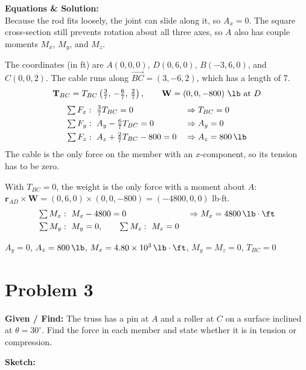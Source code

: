 \documentclass[11pt]{article}
\newcommand{\problemstart}[2]{%
    \clearpage
    \setlength{\parskip}{0.5\baselineskip}
    \setlength{\abovedisplayskip}{4pt}\setlength{\belowdisplayskip}{4pt}
    \section*{Problem #1}
    \textbf{Given / Find:} #2

    \textbf{Sketch:}
}
\begin{document}
\textbf{Equations \& Solution:}\\
Because the rod fits loosely, the joint can slide along it, so $A_x=0$. The square cross-section still prevents rotation about all three axes, so $A$ also has couple moments $M_x$, $M_y$, and $M_z$.

The coordinates (in ft) are $A(0,0,0)$, $D(0,6,0)$, $B(-3,6,0)$, and $C(0,0,2)$. The cable runs along $\overrightarrow{BC}=(3,-6,2)$, which has a length of \SI{7}{\ft}.
\[
\mathbf T_{BC}=T_{BC}\left(\tfrac37,\,-\tfrac67,\,\tfrac27\right),\qquad \mathbf W=(0,0,-800)\ \si{\lb}\ \text{at } D
\]
\begin{align*}
\textstyle\sum F_x&:\ \tfrac37T_{BC}=0 &&\Rightarrow T_{BC}=0\\
\textstyle\sum F_y&:\ A_y-\tfrac67T_{BC}=0 &&\Rightarrow A_y=0\\
\textstyle\sum F_z&:\ A_z+\tfrac27T_{BC}-800=0 &&\Rightarrow A_z=\SI{800}{\lb}
\end{align*}
The cable is the only force on the member with an $x$-component, so its tension has to be zero.

With $T_{BC}=0$, the weight is the only force with a moment about $A$: $\mathbf r_{AD}\times\mathbf W=(0,6,0)\times(0,0,-800)=(-4800,0,0)$ lb$\cdot$ft.
\begin{align*}
\textstyle\sum M_x&:\ M_x-4800=0 &&\Rightarrow M_x=\SI{4800}{\lb\cdot\ft}\\
\textstyle\sum M_y&:\ M_y=0, \qquad \textstyle\sum M_z:\ M_z=0
\end{align*}

\begin{finalanswer}
$A_y=0$, \quad $A_z=\SI{800}{\lb}$, \quad $M_x=\SI{4.80e3}{\lb\cdot\ft}$, \quad $M_y=M_z=0$, \quad $T_{BC}=0$
\end{finalanswer}

\problemstart{3}{The truss has a pin at $A$ and a roller at $C$ on a surface inclined at $\theta=30^\circ$. Find the force in each member and state whether it is in tension or compression.}
\end{document}
